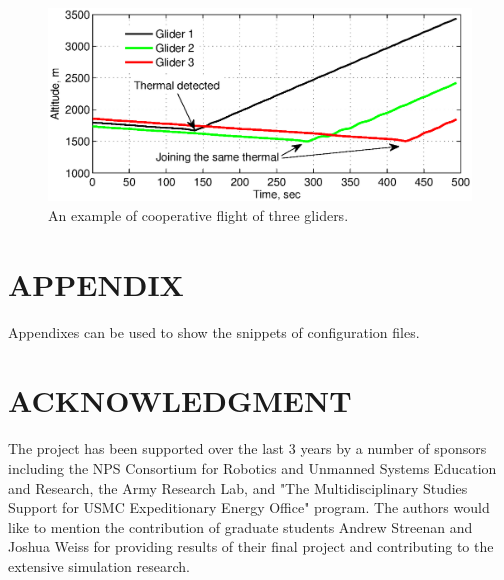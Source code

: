 \documentclass[letterpaper, 10 pt, conference]{ieeeconf}  %
\begin{document}
\begin{figure}[thpb]
  \centering
  \includegraphics[scale=0.39]{Figures/Coop_gain_altitude.eps}
  \caption{An example of cooperative flight of three gliders.}
  \label{fig:CoopFlightHeight}
\end{figure}

\section*{APPENDIX}

Appendixes can be used to show the snippets of configuration files.

\section*{ACKNOWLEDGMENT}
The project has been supported over the last 3 years by a number of sponsors 
including the NPS Consortium for Robotics and Unmanned Systems Education and 
Research, the Army Research Lab, and "The Multidisciplinary Studies Support 
for USMC Expeditionary Energy Office" program. The authors would like to 
mention the contribution of graduate students Andrew Streenan and Joshua 
Weiss for providing results of their final project and contributing to the 
extensive simulation research.




\end{document}
